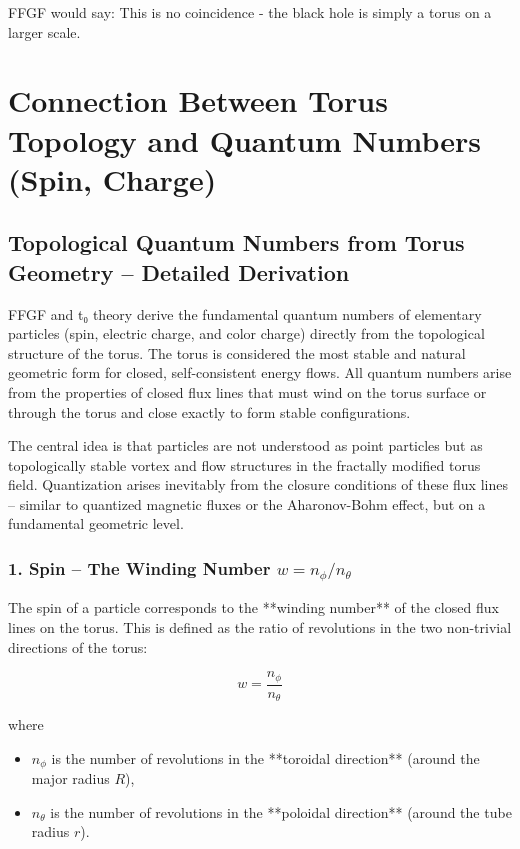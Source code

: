 FFGF would say: This is no coincidence - the black hole is simply a torus on a larger scale.

\section{Connection Between Torus Topology and Quantum Numbers (Spin, Charge)}

\subsection{Topological Quantum Numbers from Torus Geometry – Detailed Derivation}

FFGF and t₀ theory derive the fundamental quantum numbers of elementary particles (spin, electric charge, and color charge) directly from the topological structure of the torus. The torus is considered the most stable and natural geometric form for closed, self-consistent energy flows. All quantum numbers arise from the properties of closed flux lines that must wind on the torus surface or through the torus and close exactly to form stable configurations.

The central idea is that particles are not understood as point particles but as topologically stable vortex and flow structures in the fractally modified torus field. Quantization arises inevitably from the closure conditions of these flux lines – similar to quantized magnetic fluxes or the Aharonov-Bohm effect, but on a fundamental geometric level.

\subsubsection{1. Spin – The Winding Number $w = n_\phi / n_\theta$}

The spin of a particle corresponds to the **winding number** of the closed flux lines on the torus. This is defined as the ratio of revolutions in the two non-trivial directions of the torus:

\begin{equation}
	w = \frac{n_\phi}{n_\theta}
	\label{eq:winding_number}
\end{equation}

where
\begin{itemize}
	\item $n_\phi$ is the number of revolutions in the **toroidal direction** (around the major radius $R$),
	\item $n_\theta$ is the number of revolutions in the **poloidal direction** (around the tube radius $r$).
\end{itemize}

